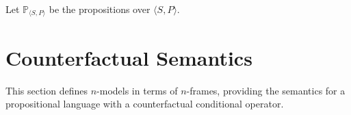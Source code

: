 \documentclass[a4paper, 11pt]{article} %
\newcommand{\tuple}[1]{\langle#1\rangle} %
\renewcommand{\P}[0]{\mathbb{P}}
\begin{document}
\begin{enumerate}
    Let $\P_{\tuple{S,P}}$ be the propositions over $\tuple{S,P}$.
\end{enumerate}




\section{Counterfactual Semantics}

This section defines $n$-models in terms of $n$-frames, providing the semantics for a propositional language with a counterfactual conditional operator.
\end{document}

